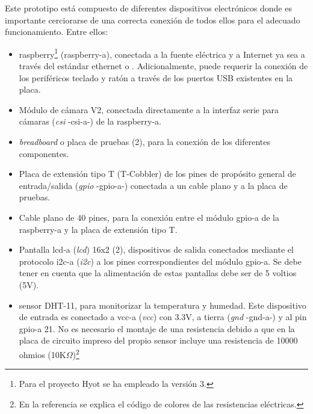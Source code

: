 \documentclass[12pt,a4paper, twoside]{report}
\begin{document}
		
	Este \gls{prototipo} está compuesto de diferentes dispositivos electrónicos donde es importante cerciorarse de una correcta conexión de todos ellos para el adecuado funcionamiento. Entre ellos:
		
	\begin{itemize}
		\item \gls{raspberry}\footnote{Para el proyecto Hyot se ha empleado la versión 3.} (\gls{raspberry-a}), conectada a la fuente eléctrica y a Internet ya sea a través del estándar \gls{ethernet} o . Adicionalmente, puede requerir la conexión de los periféricos teclado y ratón a través de los puertos USB existentes en la placa.
		\item Módulo de cámara V2, conectada directamente a la interfaz serie para cámaras (\textit{\gls{csi}} -\gls{csi-a}-) de la \gls{raspberry-a}.
		\item \textit{\Gls{breadboard}} o placa de pruebas (2), para la conexión de los diferentes componentes.
		\item Placa de extensión tipo T (T-Cobbler) de los pines de propósito general de entrada/salida (\textit{\gls{gpio}} -\gls{gpio-a}-) conectada a un cable plano y a la placa de pruebas.
		\item Cable plano de 40 pines, para la conexión entre el módulo \gls{gpio-a} de la \gls{raspberry-a} y la placa de extensión tipo T.
		\item Pantalla \gls{lcd-a} (\textit{\gls{lcd}}) 16x2 (2), dispositivos de salida conectados mediante el protocolo \gls{i2c-a} (\textit{\gls{i2c}}) a los pines correspondientes del módulo \gls{gpio-a}. Se debe tener en cuenta que la alimentación de estas pantallas debe ser de 5 voltios (5V).
		\item \Gls{sensor} DHT-11, para monitorizar la temperatura y humedad. Este dispositivo de entrada es conectado a \gls{vcc-a} (\textit{\gls{vcc}}) con 3.3V, a tierra (\textit{\gls{gnd}} -\gls{gnd-a}-) y al pin \gls{gpio-a} 21. No es necesario el montaje de una \gls{resistencia} debido a que en la placa de circuito impreso del propio \gls{sensor} incluye una \gls{resistencia} de 10000 ohmios (10K$\Omega$)\footnote{En la referencia \cite{abc:rcc} se explica el código de colores de las \glspl{resistencia} eléctricas.}	

\end{itemize}
\end{document}
